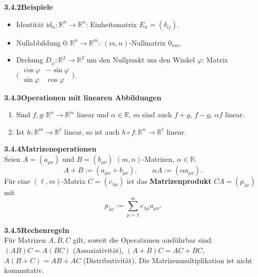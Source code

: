 \documentclass[a4paper,12pt]{article}
\newcommand{\gentry}[3]{%
  \noindent\textbf{#1\quad #2}\nopagebreak\\[0.2em]
  #3\par\smallskip
}
\begin{document}
\gentry{3.4.2}{Beispiele}{%
  \begin{itemize}[topsep=2pt,itemsep=1pt]
    \item Identit\"at $\mathrm{id}_n : \mathbb{R}^n \to \mathbb{R}^n$: Einheitsmatrix
          $E_n = (\delta_{ij})$.
    \item Nullabbildung $0 : \mathbb{R}^n \to \mathbb{R}^m$: $(m, n)$-Nullmatrix $0_{mn}$.
    \item Drehung $D_\varphi : \mathbb{R}^2 \to \mathbb{R}^2$ um den Nullpunkt um den
          Winkel $\varphi$: Matrix $\bigl(\begin{smallmatrix} \cos \varphi & -\sin \varphi \\ \sin \varphi & \cos \varphi \end{smallmatrix}\bigr)$.
  \end{itemize}
}

\gentry{3.4.3}{Operationen mit linearen Abbildungen}{%
  \begin{enumerate}[label=(\roman*),topsep=2pt,itemsep=1pt]
    \item Sind $f, g : \mathbb{R}^n \to \mathbb{R}^m$ linear und $\alpha \in \mathbb{R}$,
          so sind auch $f + g$, $f - g$, $\alpha f$ linear.
    \item Ist $h : \mathbb{R}^m \to \mathbb{R}^\ell$ linear, so ist auch
          $h \circ f : \mathbb{R}^n \to \mathbb{R}^\ell$ linear.
  \end{enumerate}
}

\gentry{3.4.4}{Matrizenoperationen}{%
  Seien $A = (a_{\mu\nu})$ und $B = (b_{\mu\nu})$ $(m, n)$-Matrizen, $\alpha \in \mathbb{R}$.
  \[
    A + B := (a_{\mu\nu} + b_{\mu\nu}), \qquad
    \alpha A := (\alpha a_{\mu\nu}).
  \]
  F\"ur eine $(\ell, m)$-Matrix $C = (c_{\lambda\mu})$ ist das \textbf{Matrizenprodukt}
  $CA = (p_{\lambda\nu})$ mit
  \[
    p_{\lambda\nu} := \sum_{\mu=1}^m c_{\lambda\mu} a_{\mu\nu}.
  \]
}

\gentry{3.4.5}{Rechenregeln}{%
  F\"ur Matrizen $A, B, C$ gilt, soweit die Operationen ausf\"uhrbar sind:
  $(AB)C = A(BC)$ (Assoziativit\"at), $(A + B)C = AC + BC$, $A(B + C) = AB + AC$
  (Distributivit\"at). Die Matrizenmultiplikation ist nicht kommutativ.
}
\end{document}
